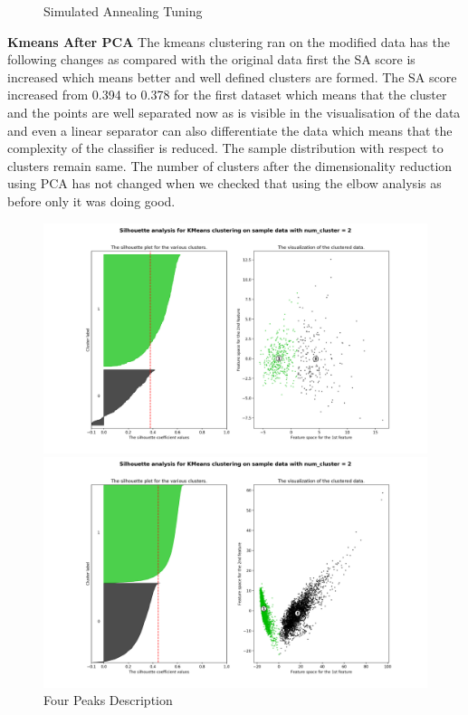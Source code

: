 \documentclass[a4paper,12pt]{article}
\begin{document}
\begin{figure}[!htb]
\begin{minipage}{0.33\textwidth}
   \end{minipage}\hfill
 \caption { Simulated Annealing Tuning}
\end{figure}
\textbf{ Kmeans After PCA }  The kmeans clustering ran on the modified data has the following changes as compared with the original data first the SA score is increased which means better and well defined clusters are formed. The SA score increased from 0.394 to 0.378 for the first dataset  which means that the cluster and the points are well separated now as is visible in the visualisation of the data and even a linear separator can also differentiate the data which means that the complexity of the classifier is reduced. The sample distribution with respect to clusters remain same. The number of clusters after the dimensionality reduction using PCA has not changed when we checked that using the elbow analysis as before only it was doing good. 
\begin{figure}[!htb]
\centering
   \begin{minipage}{0.48\textwidth}
     \centering
     \includegraphics[width=.8\linewidth]{kmeans_d1_pca}
   \end{minipage}\hfill
    \begin{minipage}{0.48\textwidth}
     \centering
     \includegraphics[width=.8\linewidth]{kmeans_d2_pca}
     
   \end{minipage}\hfill
   \caption { Four Peaks Description}
\end{figure}
\end{document}

